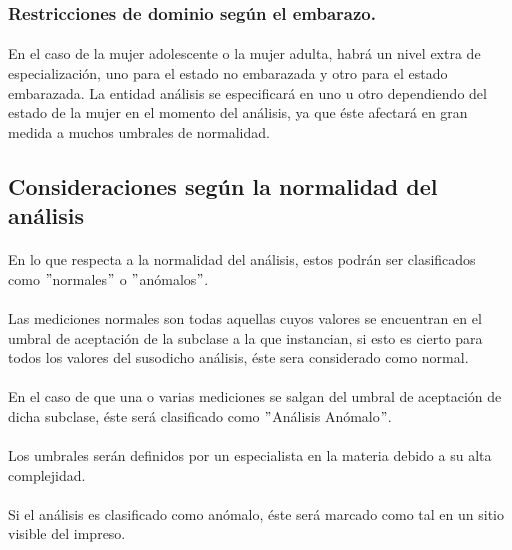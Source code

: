 \documentclass[a4paper,10pt]{article}
\begin{document}
\pagebreak

\subsubsection{Restricciones de dominio según el embarazo.}
\paragraph{}
En el caso de la mujer adolescente o la mujer adulta, habrá un nivel extra de especialización, uno para el estado no embarazada y otro para el estado embarazada. La entidad análisis se especificará en uno u otro dependiendo del estado de la mujer en el momento del análisis, ya que éste afectará en gran medida a muchos umbrales de normalidad.

\subsection{Consideraciones según la normalidad del análisis}
\paragraph{}
En lo que respecta a la normalidad del análisis, estos podrán ser clasificados como $"$normales$"$ o $"$anómalos$"$.
\paragraph{}
Las mediciones normales son todas aquellas cuyos valores se encuentran en el umbral de aceptación de la subclase a la que instancian, si esto es cierto para todos los valores del susodicho análisis, éste sera considerado como normal.
\paragraph{}
En el caso de que una o varias mediciones se salgan del umbral de aceptación de dicha subclase, éste será clasificado como $"$Análisis Anómalo$"$.
\paragraph{}
Los umbrales serán definidos por un especialista en la materia debido a su alta complejidad.
\paragraph{}
Si el análisis es clasificado como anómalo, éste será marcado como tal en un sitio visible del impreso.
\end{document}
